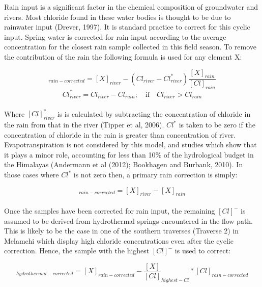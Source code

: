 Rain input is a significant factor in the chemical composition of groundwater and rivers. Most chloride found in these water bodies is thought to be due to rainwater input (Drever, 1997). It is standard practice to correct for this cyclic input. Spring water is corrected for rain input according to the average concentration for the closest rain sample collected in this field season. To remove the contribution of the rain the following formula is used for any element X:



\begin{equation}
    [X]_{rain-corrected}  = [X]_{river} - (Cl_{river} - Cl^*_{river})\frac{[X]_{rain}}{[Cl]_{rain}}
\end{equation}
\begin{equation}
    Cl^*_{river} = Cl_{river} - Cl_{rain}; \quad \text{if} \quad Cl_{river} > Cl_{rain}
\end{equation}\\
    

Where $[Cl]^*_{river}$ is is calculated by subtracting the concentration of chloride in the rain from that in the river (Tipper et al, 2006). $Cl^{*}$ is taken to be zero if the concentration of chloride in the rain is greater than concentration of river. Evapotranspiration is not considered by this model, and studies which show that it plays a minor role, accounting for less than 10\% of the hydrological budget in the Himalayas (Andermann et al (2012); Bookhagen and Burbank, 2010). In those cases where $Cl^*$ is not zero then, a primary rain correction is simply:

\begin{equation}
[X]_{rain-corrected}  = [X]_{river} - [X]_{rain}
\end{equation}\\

Once the samples have been corrected for rain input, the remaining $[Cl]^{-}$ is assumed to be derived from hydrothermal springs encountered in the flow path. This is likely to be the case in one of the southern traverses (Traverse 2) in Melamchi which display high chloride concentrations even after the cyclic correction. Hence, the sample with the highest $[Cl]^{-}$ is used to correct:

\begin{equation}
[X]_{hydrothermal-corrected}  = [X]_{rain-corrected} - \frac{[X]}{[Cl]}_{highest-Cl} * [Cl]_{rain-corrected}
\end{equation}\\

